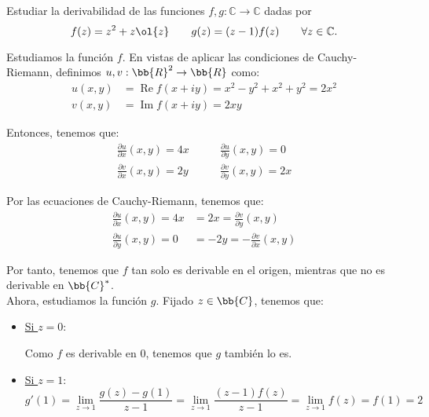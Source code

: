 \documentclass[12pt]{article}
\renewcommand{\Re}{\operatorname{Re}} %
\renewcommand{\Im}{\operatorname{Im}}
\begin{document}
    \begin{ejercicio}[3 puntos]
        Estudiar la derivabilidad de las funciones $f , g : \mathbb{C} \to \mathbb{C}$ dadas por
        \[
            f(z) = z^2+z\ol{z} \qquad g(z) = (z - 1) f(z) \qquad \forall z \in \mathbb{C}.
        \]

        Estudiamos la función $f$. En vistas de aplicar las condiciones de Cauchy-Riemann, definimos $u,v:\bb{R}^2\to\bb{R}$ como:
        \begin{align*}
            u(x,y) &= \Re f(x+iy) = x^2-y^2+ x^2+y^2 = 2x^2\\
            v(x,y) &= \Im f(x+iy) = 2xy
        \end{align*}

        Entonces, tenemos que:
        \begin{align*}
            \frac{\partial u}{\partial x}(x,y) = 4x \qquad & \frac{\partial u}{\partial y}(x,y) = 0\\
            \frac{\partial v}{\partial x}(x,y) = 2y \qquad & \frac{\partial v}{\partial y}(x,y) = 2x
        \end{align*}

        Por las ecuaciones de Cauchy-Riemann, tenemos que:
        \begin{align*}
            \frac{\partial u}{\partial x}(x,y) = 4x&=2x=\frac{\partial v}{\partial y}(x,y)\\
            \frac{\partial u}{\partial y}(x,y) = 0&=-2y=-\frac{\partial v}{\partial x}(x,y)
        \end{align*}

        Por tanto, tenemos que $f$ tan solo es derivable en el origen, mientras que no es derivable en $\bb{C}^*$.\\

        Ahora, estudiamos la función $g$. Fijado $z\in\bb{C}$, tenemos que:
        \begin{itemize}
            \item \ul{Si $z=0$}: 
            
            Como $f$ es derivable en $0$, tenemos que $g$ también lo es.

            \item \ul{Si $z=1$}:
            \begin{equation*}
                g'(1) = \lim_{z\to 1} \frac{g(z)-g(1)}{z-1} = \lim_{z\to 1} \frac{(z-1)f(z)}{z-1} = \lim_{z\to 1} f(z) = f(1) = 2
            \end{equation*}


\end{itemize}
\end{ejercicio}
\end{document}
